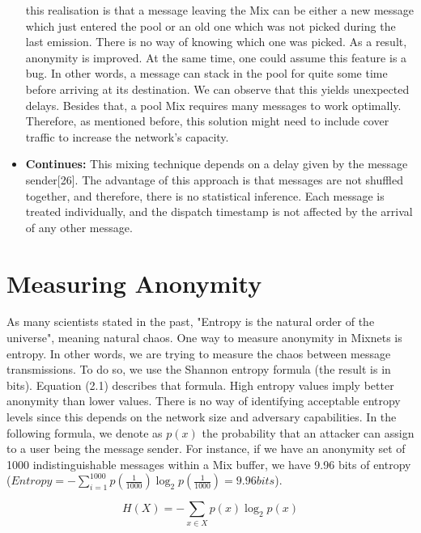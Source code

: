 \documentclass[logo,msc,cyber]{infthesis}   %
\begin{document}
\begin{itemize}
   this realisation is that a message leaving the Mix can be either a new
   message which just entered the pool or an old one which was not picked during
   the last emission. There is no way of knowing which one was picked. As a
   result, anonymity is improved. At the same time, one could assume this
   feature is a bug. In other words, a message can stack in the pool for quite
   some time before arriving at its destination. We can observe that this yields
   unexpected delays. Besides that, a pool Mix requires many messages to work
   optimally. Therefore, as mentioned before, this solution might need to
   include cover traffic to increase the network's capacity.
   \item \textbf{Continues:} This mixing technique depends on a delay given by the
   message sender[26]. The advantage of this approach is that messages are not
   shuffled together, and therefore, there is no statistical inference. Each
   message is treated individually, and the dispatch timestamp is not affected
   by the arrival of any other message.
\end{itemize}

\section{Measuring Anonymity}

As many scientists stated in the past, "Entropy is the natural order of the
universe", meaning natural chaos. One way to measure anonymity in Mixnets is
entropy. In other words, we are trying to measure the chaos between message
transmissions. To do so, we use the Shannon entropy formula (the result is in
bits). Equation (2.1) describes that formula. High entropy values imply better
anonymity than lower values. There is no way of identifying acceptable entropy
levels since this depends on the network size and adversary capabilities. In the
following formula, we denote as $p(x)$ the probability that an attacker can
assign to a user being the message sender. For instance, if we have an anonymity
set of 1000 indistinguishable messages within a Mix buffer, we have 9.96 bits of
entropy ($Entropy = -\sum_{i = 1}^{1000}p(\frac{1}{1000}) \log_2p(\frac{1}{1000}) = 9.96 bits$). 

\begin{equation}
    \label{eq:entropy}
    H(X) = -\sum_{x \in X} p(x) \log_2p(x)     
\end{equation}
\end{document}
